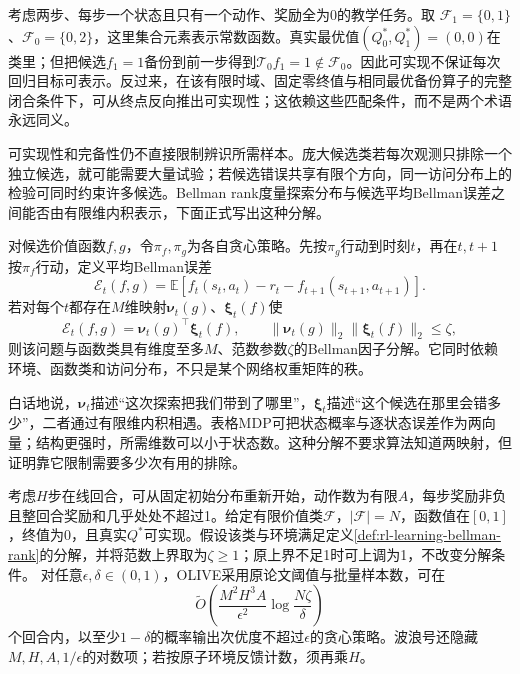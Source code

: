 考虑两步、每步一个状态且只有一个动作、奖励全为0的教学任务。取
$\mathcal F_1=\{0,1\}$、$\mathcal F_0=\{0,2\}$，这里集合元素表示常数函数。真实最优值$(Q_0^*,Q_1^*)=(0,0)$在类里；但把候选$f_1=1$备份到前一步得到$\mathcal T_0f_1=1\notin\mathcal F_0$。因此可实现不保证每次回归目标可表示。反过来，在该有限时域、固定零终值与相同最优备份算子的完整闭合条件下，可从终点反向推出可实现性；这依赖这些匹配条件，而不是两个术语永远同义。

可实现性和完备性仍不直接限制辨识所需样本。庞大候选类若每次观测只排除一个独立候选，就可能需要大量试验；若候选错误共享有限个方向，同一访问分布上的检验可同时约束许多候选。Bellman rank度量探索分布与候选平均Bellman误差之间能否由有限维内积表示，下面正式写出这种分解。

\begin{definition}[一种Bellman因子分解]
  \label{def:rl-learning-bellman-rank}
  对候选价值函数$f,g$，令$\pi_f,\pi_g$为各自贪心策略。先按$\pi_g$行动到时刻$t$，再在$t,t+1$按$\pi_f$行动，定义平均Bellman误差
  \[
    \mathcal E_t(f,g)
     =\mathbb E[
        f_t(s_t,a_t)-r_t-f_{t+1}(s_{t+1},a_{t+1})].
  \]
  若对每个$t$都存在$M$维映射$\bm\nu_t(g)$、$\bm\xi_t(f)$使
  \[
    \mathcal E_t(f,g)=\bm\nu_t(g)^\top\bm\xi_t(f),\qquad
    \|\bm\nu_t(g)\|_2\|\bm\xi_t(f)\|_2\leq\zeta,
  \]
  则该问题与函数类具有维度至多$M$、范数参数$\zeta$的Bellman因子分解。它同时依赖环境、函数类和访问分布，不只是某个网络权重矩阵的秩。
\end{definition}

白话地说，$\bm\nu_t$描述“这次探索把我们带到了哪里”，$\bm\xi_t$描述“这个候选在那里会错多少”，二者通过有限维内积相遇。表格MDP可把状态概率与逐状态误差作为两向量；结构更强时，所需维数可以小于状态数。这种分解不要求算法知道两映射，但证明靠它限制需要多少次有用的排除。

\begin{theorem}
  \label{thm:rl-learning-olive}
  考虑$H$步在线回合，可从固定初始分布重新开始，动作数为有限$A$，每步奖励非负且整回合奖励和几乎处处不超过1。给定有限价值类$\mathcal F$，$|\mathcal F|=N$，函数值在$[0,1]$，终值为0，且真实$Q^*$可实现。假设该类与环境满足定义\ref{def:rl-learning-bellman-rank}的分解，并将范数上界取为$\zeta\geq1$；原上界不足1时可上调为1，不改变分解条件。
  对任意$\epsilon,\delta\in(0,1)$，OLIVE采用原论文阈值与批量样本数，可在
  \[
    \widetilde O\left(
       \frac{M^2H^3A}{\epsilon^2}
                         \log\frac{N\zeta}{\delta}\right)
  \]
  个回合内，以至少$1-\delta$的概率输出次优度不超过$\epsilon$的贪心策略。波浪号还隐藏$M,H,A,1/\epsilon$的对数项；若按原子环境反馈计数，须再乘$H$。
\end{theorem}


